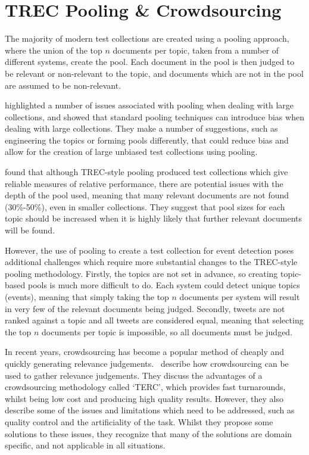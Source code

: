 
\section{TREC Pooling \& Crowdsourcing}
The majority of modern test collections are created using a pooling approach, where the union of the top \(n\) documents per topic, taken from a number of different systems, create the pool. Each document in the pool is then judged to be relevant or non-relevant to the topic, and documents which are not in the pool are assumed to be non-relevant.

\cite{Buckley:2007:BLP:1298708.1298735} highlighted a number of issues associated with pooling when dealing with large collections, and showed that standard pooling techniques can introduce bias when dealing with large collections. They make a number of suggestions, such as engineering the topics or forming pools differently, that could reduce bias and allow for the creation of large unbiased test collections using pooling.

\cite{Zobel:1998:RRL:290941.291014} found that although TREC-style pooling produced test collections which give reliable measures of relative performance, there are potential issues with the depth of the pool used, meaning that many relevant documents are not found (30\%-50\%), even in smaller collections. They suggest that pool sizes for each topic should be increased when it is highly likely that further relevant documents will be found.

However, the use of pooling to create a test collection for event detection poses additional challenges which require more substantial changes to the TREC-style pooling methodology. Firstly, the topics are not set in advance, so creating topic-based pools is much more difficult to do.
Each system could detect unique topics (events), meaning that simply taking the top \(n\) documents per system will result in very few of the relevant documents being judged. Secondly, tweets are not ranked against a topic and all tweets are considered equal, meaning that selecting the top \(n\) documents per topic is impossible, so all documents must be judged.

In recent years, crowdsourcing has become a popular method of cheaply and quickly generating relevance judgements.~\cite{Alonso:2008:CRE:1480506.1480508} describe how crowdsourcing can be used to gather relevance judgements. They discuss the advantages of a crowdsourcing methodology called `TERC', which provides fast turnarounds, whilst being low cost and producing high quality results. However, they also describe some of the issues and limitations which need to be addressed, such as quality control and the artificiality of the task. Whilst they propose some solutions to these issues, they recognize that many of the solutions are domain specific, and not applicable in all situations.

